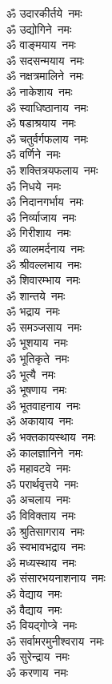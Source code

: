 \begin{multicols}{2}
\begin{flushleft}
ॐ उदारकीर्तये~नमः\hfill{}\\
ॐ उद्योगिने~नमः\\
ॐ वाङ्मयाय~नमः\\
ॐ सदसन्मयाय~नमः\\
ॐ नक्षत्रमालिने~नमः\\
ॐ नाकेशाय~नमः\\
ॐ स्वाधिष्ठानाय~नमः\\
ॐ षडाश्रयाय~नमः\\
ॐ चतुर्वर्गफलाय~नमः\\
ॐ वर्णिने~नमः\\
ॐ शक्तित्रयफलाय~नमः\hfill{}\\
ॐ निधये~नमः\\
ॐ निदानगर्भाय~नमः\\
ॐ निर्व्याजाय~नमः\\
ॐ गिरीशाय~नमः\\
ॐ व्यालमर्दनाय~नमः\\
ॐ श्रीवल्लभाय~नमः\\
ॐ शिवारम्भाय~नमः\\
ॐ शान्तये~नमः\\
ॐ भद्राय~नमः\\
ॐ समञ्जसाय~नमः\hfill{}\\
ॐ भूशयाय~नमः\\
ॐ भूतिकृते~नमः\\
ॐ भूत्यै~नमः\\
ॐ भूषणाय~नमः\\
ॐ भूतवाहनाय~नमः\\
ॐ अकायाय~नमः\\
ॐ भक्तकायस्थाय~नमः\\
ॐ कालज्ञानिने~नमः\\
ॐ महावटवे~नमः\\
ॐ परार्थवृत्तये~नमः\hfill{}\\
ॐ अचलाय~नमः\\
ॐ विविक्ताय~नमः\\
ॐ श्रुतिसागराय~नमः\\
ॐ स्वभावभद्राय~नमः\\
ॐ मध्यस्थाय~नमः\\
ॐ संसारभयनाशनाय~नमः\\
ॐ वेद्याय~नमः\\
ॐ वैद्याय~नमः\\
ॐ वियद्गोप्त्रे~नमः\\
ॐ सर्वामरमुनीश्वराय~नमः\hfill{}\\
ॐ सुरेन्द्राय~नमः\\
ॐ करणाय~नमः\\

\end{flushleft}
\end{multicols}
